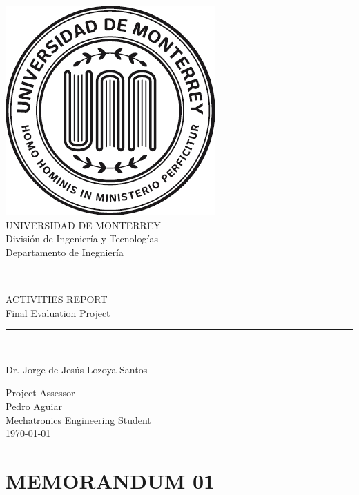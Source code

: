 \documentclass[paper=A4, fontsize=11pt, titlepage]{article}
\numberwithin{equation}{section}
\numberwithin{figure}{section}
\numberwithin{table}{section}
\newcommand{\horrule}[1]{\rule{\linewidth}{#1}}
\newcommand*{\sectionpostamble}{}
\newcommand*{\fromto}[1]{\def\sectionpostamble{#1}}
\begin{document}
  \begin{titlepage}
    \begin{center}
	\includegraphics[height=0.35\textwidth]{fig/udemlogo}\\
	\vspace{2mm}
	\huge UNIVERSIDAD DE MONTERREY\\
	\vspace{1mm}
	\Large División de Ingeniería y Tecnologías\\
	\vspace{1mm}
	\large Departamento de Inegniería\\
	\vspace{10mm}
	\horrule{1pt} \\[0.4cm]
	\Huge ACTIVITIES REPORT\\ 
	\large Final Evaluation Project\\
	\horrule{2pt} \\[0.5cm]
	\vspace{10mm}
	\Large\raggedright Dr. Jorge de Jesús Lozoya Santos\\
	\normalsize\raggedright Project Assessor\\
	\vspace{10mm}
	\Large\raggedleft Pedro Aguiar\\
	\normalsize\raggedleft Mechatronics Engineering Student\\
	\vspace{20mm}
	\Large\centering\today\\
    \end{center}
  \end{titlepage}

\tableofcontents
\clearpage
\listoffigures
\listoftables
\clearpage
{}

\fromto{April 23 - May 2}
\section{MEMORANDUM 01}
\end{document}
